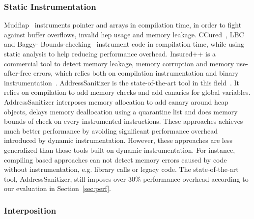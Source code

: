 \subsubsection{Static Instrumentation}
Mudflap~\cite{overflow:Mudflap} instruments pointer and arrays in compilation time, in order to fight against buffer overflows, invalid hep usage and memory leakage. CCured~\cite{overflow:ccured}, LBC~\cite{overflow:lbc} and Baggy- Bounds-checking~\cite{overflow:Baggy} instrument code in compilation time, while using static analysis to help reducing performance overhead. Insured++ is a commercial tool to detect memory leakage, memory corruption and memory use-after-free errors, which relies both on compilation instrumentation and binary instrumentation~\cite{overflow:Insure++}. AddressSanitizer is the state-of-the-art tool in this field~\cite{AddressSanitizer}. It relies on compilation to add memory checks and add canaries for global variables. AddressSanitizer interposes memory allocation to add canary around heap objects, delays memory deallocation using a quarantine list and does memory bounds-of-check on every instrumented instructions. These approaches achieves much better performance by avoiding significant performance overhead introduced by dynamic instrumentation. However, these approaches are less generalized than those tools built on dynamic instrumentation. For instance, compiling based approaches can not detect memory errors caused by code without instrumentation, e.g. library calls or legacy code. The state-of-the-art tool, AddressSanitizer, still imposes over 30\% performance overhead according to our evaluation in Section~\ref{sec:perf}. 

\subsubsection{Interposition}
\begin{comment}
There are approaches relying on library interposition to detect certain memory errors caused by some library functions.
 such as buffer overflows caused by memcpy, strcpy ~\cite{Libsafe, HeapShield, LibsafePlus}. They are interposing specific library functions and checks bound of objects in these functions. However, they are far from a generalized tool because they can not detect errors caused by pointer operations and they can not detect other types of memory errors, such as use-after-free errors and memory leaks. 
\end{comment}

